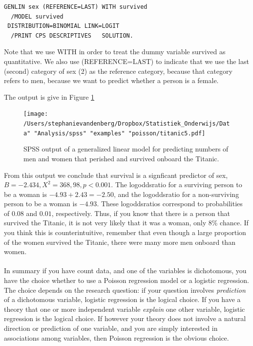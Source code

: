 \documentclass[]{book}\usepackage[]{graphicx}\usepackage[]{color}
\begin{document}
\begin{verbatim}
GENLIN sex (REFERENCE=LAST) WITH survived
  /MODEL survived
 DISTRIBUTION=BINOMIAL LINK=LOGIT
  /PRINT CPS DESCRIPTIVES   SOLUTION.
\end{verbatim}


Note that we use WITH in order to treat the dummy variable survived as quantitative. We also use (REFERENCE=LAST) to indicate that we use the last (second) category of sex (2) as the reference category, because that category refers to men, because we want to predict whether a person is a female.

The output is give in Figure \ref{fig:titanic5}

\begin{figure}[h]
    \begin{center}
       \texttt{[image: /Users/stephanievandenberg/Dropbox/Statistiek\_Onderwijs/Data" "Analysis/spss" "examples" "poisson/titanic5.pdf]}
    \end{center}
     \caption{SPSS output of a generalized linear model for predicting numbers of men and women that perished and survived onboard the Titanic.}
    \label{fig:titanic5}
\end{figure}


From this output we conclude that survival is a signficant predictor of sex, $B=-2.434, X^2=368,98, p<0.001$. The logoddsratio for a surviving person to be a woman is $-4.93 +2.43= -2.50$, and the logoddsratio for a non-surviving person to be a woman is $-4.93$. These logoddsratios correspond to probabilities of $0.08$ and $0.01$, respectively. Thus, if you know that there is a person that survived the Titanic, it is not very likely that it was a woman, only 8\% chance. If you think this is counterintuitive, remember that even though a large proportion of the women survived the Titanic, there were many more men onboard than women.
\\
\\
In summary if you have count data, and one of the variables is dichotomous, you have the choice whether to use a Poisson regression model or a logistic regression. The choice depends on the research question: if your question involves \textit{prediction} of a dichotomous variable, logistic regression is the logical choice. If you have a theory that one or more independent variable \textit{explain} one other variable, logistic regression is the logical choice. If however your theory does not involve a natural direction or prediction of one variable, and you are simply interested in associations among variables, then Poisson regression is the obvious choice.



\end{document}
